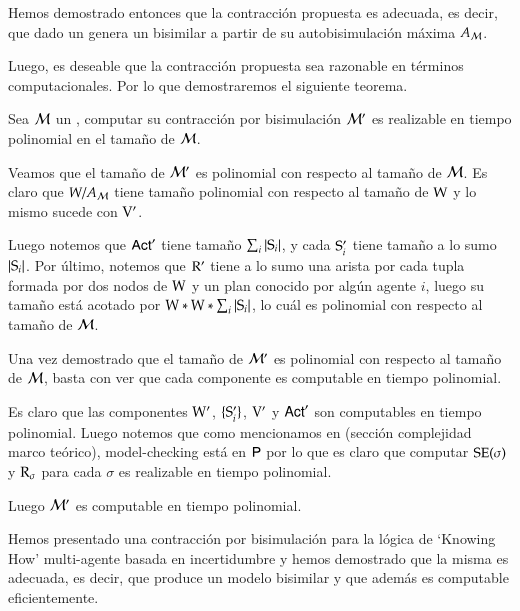 Hemos demostrado entonces que la contracción propuesta es adecuada, es decir, que dado un \ults genera un \ults bisimilar a partir de su 
autobisimulación máxima $A_\modults$.

Luego, es deseable que la contracción propuesta sea razonable en términos computacionales. Por lo que demostraremos el siguiente teorema.


\begin{teorema}
    Sea $\modults$ un \ults, computar su contracción por bisimulación $\modults'$ es realizable en tiempo polinomial en el 
    tamaño de $\modults$.
\end{teorema}

\begin{demostracion}
    Veamos que el tamaño de $\modults'$ es polinomial con respecto al tamaño de $\modults$. Es claro que $W/A_\modults$ tiene tamaño polinomial con 
    respecto al tamaño de $\W$ y lo mismo sucede con $\V'$. 

    Luego notemos que $\ACT'$ tiene tamaño $\sum_{i} |\S_i|$, y cada $\S_i'$ tiene tamaño a lo sumo $|\S_i|$. Por último, notemos que $\R'$ tiene a lo 
    sumo una arista por cada tupla formada por dos nodos de $\W$ y un plan conocido por algún agente $i$, luego su tamaño está acotado por 
    $\W * \W * \sum_{i}|\S_i|$, lo cuál es polinomial con respecto al tamaño de $\modults$.

    Una vez demostrado que el tamaño de $\modults'$ es polinomial con respecto al tamaño de $\modults$, basta con ver que cada componente es computable en 
    tiempo polinomial. 

    Es claro que las componentes $\W'$, $\{\S_i'\}$, $\V'$ y $\ACT'$ son computables en tiempo polinomial. Luego notemos que como mencionamos en 
    (sección complejidad marco teórico), model-checking está en $\Poly$ por lo que es claro que computar $\sexec(\sigma)$ y $\R_\sigma$
    para cada $\sigma$ es realizable en tiempo polinomial. 

    Luego $\modults'$ es computable en tiempo polinomial.
\end{demostracion}

Hemos presentado una contracción por bisimulación para la lógica de `Knowing How' multi-agente basada en incertidumbre y hemos demostrado que 
la misma es adecuada, es decir, que produce un modelo bisimilar y que además es computable eficientemente.

